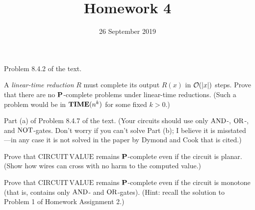 \documentclass{../math167}
\title{Homework 4}
\author{}
\date{26 September 2019}
\begin{document}
\begin{problems}
\item Problem 8.4.2 of the text.

  \begin{book}
    A \emph{linear-time reduction} \(R\) must complete its output
    \(R(x)\) in \(\O(\abs x)\) steps.  Prove that there are no
    \(\P\)-complete problems under linear-time reductions.  (Such a
    problem would be in \(\TIME(n^k)\) for some fixed \(k>0\).)
  \end{book}

  \begin{solution}
  \end{solution}

\item Part (a) of Problem 8.4.7 of the text.  (Your circuits should
  use only \(\AND\)-, \(\OR\)-, and \(\NOT\)-gates.  Don't worry if
  you can't solve Part (b); I believe it is misstated---in any case it
  is not solved in the paper by Dymond and Cook that is cited.)

  \begin{book}
    \begin{problems}
    \item Prove that \(\mathrm{CIRCUIT\,VALUE}\) remains
      \(\P\)-complete even if the circuit is planar.  (Show how wires
      can cross with no harm to the computed value.)
    \end{problems}
  \end{book}

  \begin{solution}
  \end{solution}

\item Prove that \(\mathrm{CIRCUIT\,VALUE}\) remains \(\P\)-complete
  even if the circuit is monotone (that is, contains only \(\AND\)-
  and \(\OR\)-gates).  (Hint: recall the solution to Problem 1 of
  Homework Assignment 2.)

  \begin{solution}
  \end{solution}

\end{problems}
\end{document}
